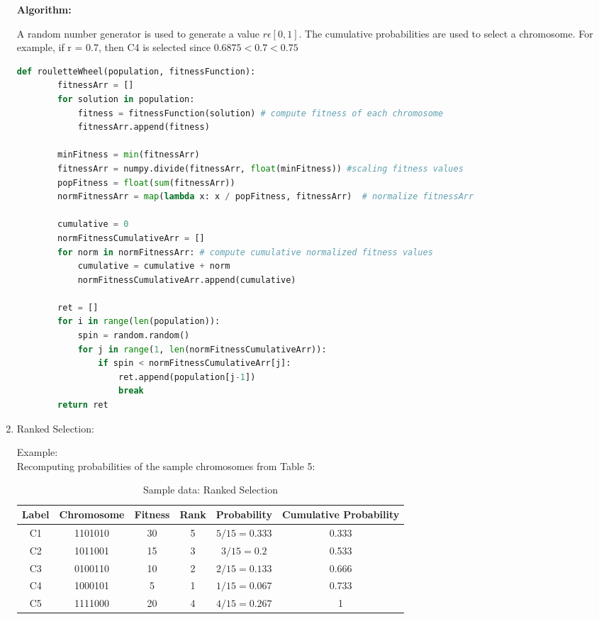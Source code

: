 \documentclass[12pt,a4paper]{article}
\begin{document}
\begin{enumerate}
	
	\textbf{Algorithm:}\par
	A random number generator is used to generate a value $r \epsilon [0,1]$. The cumulative probabilities are used to select a chromosome. For example, if r = 0.7, then C4 is selected since $0.6875 < 0.7 < 0.75$
	\vspace{5mm}
	\begin{lstlisting}[language=Python]
    def rouletteWheel(population, fitnessFunction):
        fitnessArr = []
        for solution in population:
            fitness = fitnessFunction(solution) # compute fitness of each chromosome
            fitnessArr.append(fitness)
        
        minFitness = min(fitnessArr)
        fitnessArr = numpy.divide(fitnessArr, float(minFitness)) #scaling fitness values
        popFitness = float(sum(fitnessArr))   
        normFitnessArr = map(lambda x: x / popFitness, fitnessArr)  # normalize fitnessArr
        
        cumulative = 0
        normFitnessCumulativeArr = []
        for norm in normFitnessArr: # compute cumulative normalized fitness values
            cumulative = cumulative + norm
            normFitnessCumulativeArr.append(cumulative)
        
        ret = []
        for i in range(len(population)):
            spin = random.random()
            for j in range(1, len(normFitnessCumulativeArr)):
                if spin < normFitnessCumulativeArr[j]:
                    ret.append(population[j-1])
                    break
        return ret    
	\end{lstlisting}

	\item Ranked Selection: \par
	Example: \\
	Recomputing probabilities of the sample chromosomes from Table 5:
	\begin{table}[H]
		\centering
		\caption{Sample data: Ranked Selection}
		\begin{tabular}{ |c|c|c|c|c|c| }
			\hline
			Label & Chromosome & Fitness & Rank & Probability & Cumulative Probability \\
			\hline
			\hline
			C1 & 1101010 & 30 & 5 & $5/15=0.333$ & 0.333 \\
			\hline
			C2 & 1011001 & 15 & 3 & $3/15=0.2$ & 0.533 \\
			\hline
			C3 & 0100110 & 10 & 2 & $2/15=0.133$ & 0.666 \\
			\hline
			C4 & 1000101 & 5 & 1 & $1/15=0.067$ & 0.733 \\
			\hline
			C5 & 1111000 & 20 & 4 & $4/15=0.267$ & 1 \\
			\hline
		\end{tabular}
	\end{table}	
	

\end{enumerate}
\end{document}
